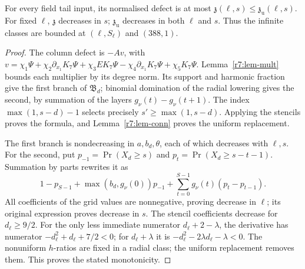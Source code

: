 \begin{lemma}\label{r7:lem-envelope}
For every field tail input, its normalised defect is at most $\mathfrak z(\ell,s)\leq\mathfrak z_{\mathrm u}(\ell,s)$. For fixed $\ell$, $\mathfrak z$ decreases in $s$; $\mathfrak z_{\mathrm u}$ decreases in both $\ell$ and $s$. Thus the infinite classes are bounded at $(\ell,S_\ell)$ and $(388,1)$.
\end{lemma}
\begin{proof}
The column defect is $-Av$, with $v=\chi_1\Psi+\chi_2\partial_{x_1}K_7\Psi+\chi_3EK_7\Psi-\chi_4\partial_{x_1}K_7\Psi+\chi_5K_7\Psi$. Lemma~\ref{r7:lem-mult} bounds each multiplier by its degree norm. Its support and harmonic fraction give the first branch of $\mathfrak B_d$; binomial domination of the radial lowering gives the second, by summation of the layers $g_\nu(t)-g_\nu(t+1)$. The index $\max(1,s-d)-1$ selects precisely $s'\geq\max(1,s-d)$. Applying the stencils proves the formula, and Lemma~\ref{r7:lem-conn} proves the uniform replacement.

The first branch is nondecreasing in $a,b_d,\theta$, each of which decreases with $\ell,s$. For the second, put $p_{-1}=\Pr(X_d\geq s)$ and $p_t=\Pr(X_d\geq s-t-1)$. Summation by parts rewrites it as
\[
1-p_{S-1}+\max(b_d,g_\nu(0))p_{-1}+\sum_{t=0}^{S-1}g_\nu(t)(p_t-p_{t-1}).
\]
All coefficients of the grid values are nonnegative, proving decrease in $\ell$; its original expression proves decrease in $s$. The stencil coefficients decrease for $d_\ell\geq9/2$. For the only less immediate numerator $d_\ell+2-\lambda$, the derivative has numerator $-d_\ell^2+d_\ell+7/2<0$; for $d_\ell+\lambda$ it is $-d_\ell^2-2\lambda d_\ell-\lambda<0$. The nonuniform $h$-ratios are fixed in a radial class; the uniform replacement removes them. This proves the stated monotonicity.
\end{proof}

